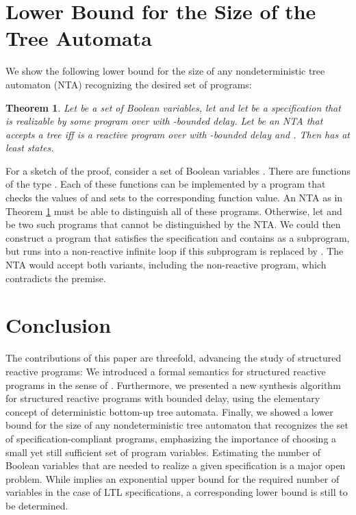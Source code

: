 \documentclass[submission,copyright,creativecommons]{eptcs}
\newtheorem{theorem}{Theorem}
\begin{document}
\section{Lower Bound for the Size of the Tree Automata}\label{optimality}

We show the following lower bound for the size of any nondeterministic tree
automaton (NTA) recognizing the desired set of programs:
\begin{theorem}\label{lowerboundnta}
	Let  be a set of  Boolean variables,
	let  and
	let 
	be a specification that is realizable by some program over  with
	-bounded delay.
	Let  be an NTA that accepts
	a tree  iff  is a reactive program over  with -bounded delay
	and .
	Then  has at least  states.
\end{theorem}

For a sketch of the proof,
consider a set of Boolean variables .
There are  functions of the type
.
Each of these functions can be implemented by a program that checks the values
of  and sets  to the corresponding function value.
An NTA as in Theorem \ref{lowerboundnta} must be able to distinguish
all of these programs.
Otherwise, let  and  be two such programs that cannot be
distinguished by the NTA.
We could then construct a program that satisfies the specification and
contains  as a subprogram, but runs into a non-reactive infinite loop
if this subprogram is replaced by .
The NTA would accept both variants, including the non-reactive program,
which contradicts the premise.


\section{Conclusion}

The contributions of this paper are threefold,
advancing the study of structured reactive programs:
We introduced a formal semantics for structured reactive programs in the sense
of \cite{madhusudan:LIPIcs:2011:3247}.
Furthermore, we presented a new synthesis algorithm for structured reactive
programs with bounded delay, using the elementary concept of deterministic
bottom-up tree automata.
Finally, we showed a lower bound for the size of any nondeterministic tree
automaton that recognizes the set of specification-compliant programs,
emphasizing the importance of choosing a small yet still sufficient set of
program variables.
Estimating the number of Boolean variables that are needed to realize a given
specification is a major open problem.
While \cite{rosner} implies an exponential upper bound for the required
number of variables in the case of LTL specifications, a corresponding lower
bound is still to be determined.
\end{document}
